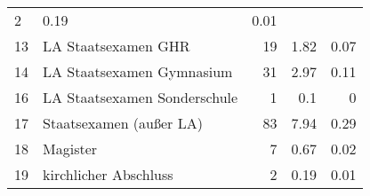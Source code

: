 \begin{longtable}{lXrrr}
       \num{2} &
       \num[round-mode=places,round-precision=2]{0,19} &
         \num[round-mode=places,round-precision=2]{0,01} \\

     13 &
     \multicolumn{1}{X}{ LA Staatsexamen GHR   } &


       \num{19} &
       \num[round-mode=places,round-precision=2]{1,82} &
         \num[round-mode=places,round-precision=2]{0,07} \\

     14 &
     \multicolumn{1}{X}{ LA Staatsexamen Gymnasium   } &


       \num{31} &
       \num[round-mode=places,round-precision=2]{2,97} &
         \num[round-mode=places,round-precision=2]{0,11} \\

     16 &
     \multicolumn{1}{X}{ LA Staatsexamen Sonderschule   } &


       \num{1} &
       \num[round-mode=places,round-precision=2]{0,1} &
         \num[round-mode=places,round-precision=2]{0} \\

     17 &
     \multicolumn{1}{X}{ Staatsexamen (außer LA)   } &


       \num{83} &
       \num[round-mode=places,round-precision=2]{7,94} &
         \num[round-mode=places,round-precision=2]{0,29} \\

     18 &
     \multicolumn{1}{X}{ Magister   } &


       \num{7} &
       \num[round-mode=places,round-precision=2]{0,67} &
         \num[round-mode=places,round-precision=2]{0,02} \\

     19 &
     \multicolumn{1}{X}{ kirchlicher Abschluss   } &


       \num{2} &
       \num[round-mode=places,round-precision=2]{0,19} &
         \num[round-mode=places,round-precision=2]{0,01} \\


\end{longtable}

